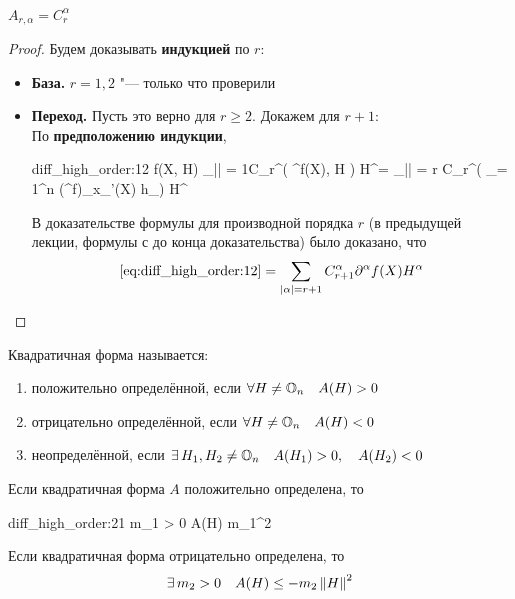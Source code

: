 \begin{theorem}
	$ A_{r,\alpha} = C_r^\alpha $
\end{theorem}

\begin{proof}
	Будем доказывать \textbf{индукцией} по $ r $:
	\begin{itemize}
		\item \textbf{База.} $ r = 1, 2 $ "--- только что проверили
		\item \textbf{Переход.} Пусть это верно для $ r \ge 2 $. Докажем для $ r + 1 $: \\
		По \textbf{предположению индукции},
		\begin{equ}{diff_high_order:12}
			\di[r + 1] f(X, H) \bdefeq{\di[r + 1]} \sum_{|\alpha| = 1}C_r^\alpha \di \bigg( \partial^\alpha f(X), H \bigg) H^\alpha = \sum_{|\alpha| = r} C_r^\alpha \bigg( \sum_{\nu = 1}^n (\partial^\alpha f)_{x_\nu}'(X) h_\nu \bigg) H^\alpha
		\end{equ}
		В доказательстве формулы для производной порядка $ r $ (в предыдущей лекции, формулы с  до конца доказательства) было доказано, что
		$$ \eref{diff_high_order:12} = \sum_{|\alpha| = r + 1} C_{r + 1}^\alpha \partial^\alpha f(X) H^\alpha $$
	\end{itemize}
\end{proof}

\begin{remind}
	Квадратичная форма называется:
	\begin{enumerate}
		\item положительно определённой, если $ \forall H \ne \mathbb{O}_{n} \quad A(H) > 0 $
		\item отрицательно определённой, если $ \forall H \ne \mathbb{O}_{n} \quad A(H) < 0 $
		\item неопределённой, если $ \exists\, H_1, H_2 \ne \mathbb{O}_{n} \quad A(H_1) > 0, \quad A(H_2) < 0 $
	\end{enumerate}
\end{remind}

\begin{theorem}
	Если квадратичная форма $ A $ положительно определена, то
	\begin{equ}{diff_high_order:21}
		\exist m_1 > 0 \quad A(H) \ge m_1^2
	\end{equ}
	Если квадратичная форма отрицательно определена, то
	$$ \exists\, m_2 > 0 \quad A(H) \le -m_2\left\|{H}\right\|^2 $$
\end{theorem}


